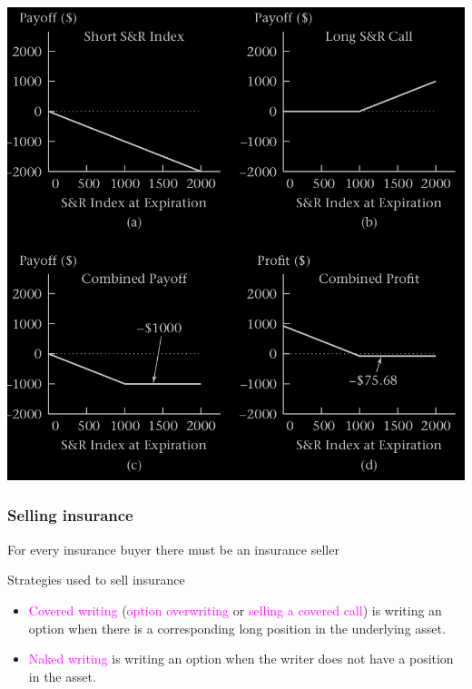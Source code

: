\begin{frame}[fragile]
	\begin{center}
		\includegraphics[scale=0.25]{figs/Figure-3-3.png}
	\end{center}
\end{frame}
\begin{frame}[fragile,t]
	\frametitle{Selling insurance}
	\centering

	For every insurance buyer there must be an insurance seller

	\pause
	\bigskip
	\mySeparateLine
	\bigskip

	Strategies used to sell insurance
	\pause
	\bigskip

	\begin{itemize}
		\item \textcolor{magenta}{Covered writing} (\textcolor{magenta}{option overwriting} or
			\textcolor{magenta}{selling a covered call}) is writing an option when there is a corresponding long position in the
			underlying asset.

			\bigskip
		\item \textcolor{magenta}{Naked writing} is writing an option when the writer does not have a
			position in the asset.
	\end{itemize}
\end{frame}
